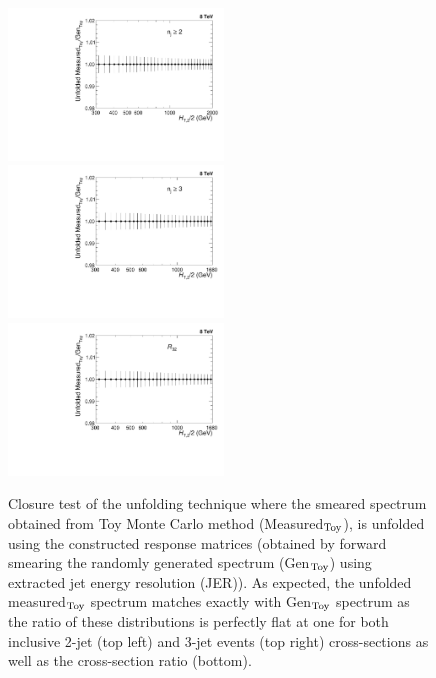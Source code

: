 \begin{figure}[!ht]
 \begin{center}
 \hspace*{-3mm}\includegraphics[width=0.51\textwidth]{Plots_HT_2_150/Ratio_Unfolding_NLO_2_funcI.pdf}%
 ~~\includegraphics[width=0.51\textwidth]{Plots_HT_2_150/Ratio_Unfolding_NLO_3_funcI.pdf}\\
 \includegraphics[width=0.51\textwidth]{Plots_HT_2_150/Ratio_Unfolding_NLO_Ratio_32_funcI.pdf}
 \caption{Closure test of the unfolding technique where the smeared spectrum obtained from Toy Monte Carlo method (Measured$_{\rm Toy}$), is unfolded using the constructed response matrices (obtained by forward smearing the randomly generated spectrum (Gen$_{\rm Toy}$) using extracted jet energy resolution (JER)). As expected, the unfolded measured$_{\rm Toy}$ spectrum matches exactly with Gen$_{\rm Toy}$ spectrum as the ratio of these distributions is perfectly flat at one for both inclusive 2-jet (top left) and 3-jet events (top right) cross-sections as well as the cross-section ratio \ratio (bottom).}
 \label{fig:unfolded_smeared}
 \end{center}
\end{figure}


